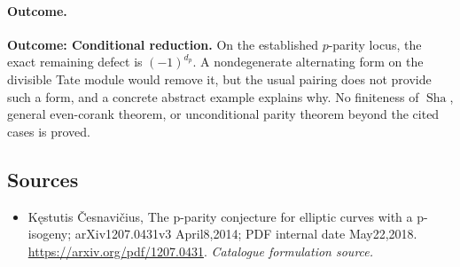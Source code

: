 \documentclass[11pt,a4paper]{article}
\numberwithin{equation}{section}
\begin{document}
\paragraph{Outcome.}
\textbf{Outcome: Conditional reduction.}
On the established $p$-parity locus, the exact remaining defect is $(-1)^{d_p}$. A nondegenerate alternating form on the divisible Tate module would remove it, but the usual pairing does not provide such a form, and a concrete abstract example explains why. No finiteness of $\operatorname{Sha}$, general even-corank theorem, or unconditional parity theorem beyond the cited cases is proved.

\subsection{Sources}
\begin{itemize}\raggedright
\item[\textnormal{[S1]}]\hypertarget{source:statement:1}{} Kęstutis Česnavičius, The p-parity conjecture for elliptic curves with a p-isogeny; arXiv1207.0431v3 April8,2014; PDF internal date May22,2018.
\url{https://arxiv.org/pdf/1207.0431}.
{\small\textit{Catalogue formulation source.}}
\end{itemize}
\end{document}
